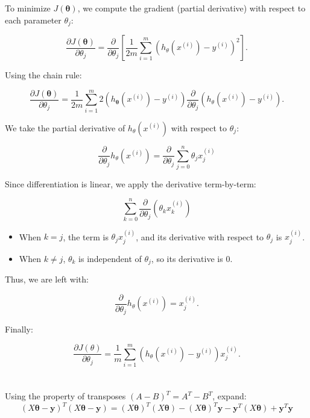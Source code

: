 To minimize \(J(\boldsymbol{\theta})\), we compute the gradient (partial derivative) with respect to each
parameter \(\theta_j\):

\[
\frac{\partial J(\boldsymbol{\theta})}{\partial \theta_j} = \frac{\partial}{\partial \theta_j} \left[ \frac{1}{2m} \sum_{i=1}^{m} \left( h_{\theta}(x^{(i)}) - y^{(i)} \right)^2 \right].
\]

Using the chain rule:

\[
\frac{\partial J(\boldsymbol{\theta})}{\partial \theta_j} = \frac{1}{2m} \sum_{i=1}^{m} 2 \left( h_{\boldsymbol{\theta}}(x^{(i)}) - y^{(i)} \right) \frac{\partial}{\partial \theta_j} \left( h_{\theta}(x^{(i)}) - y^{(i)} \right).
\]

We take the partial derivative of \( h_{\theta}(x^{(i)}) \) with respect to \( \theta_j \):

\[
\frac{\partial}{\partial \theta_j} h_{\theta}(x^{(i)}) = \frac{\partial}{\partial \theta_j} \sum_{j=0}^{n} \theta_j x_j^{(i)}
\]

Since differentiation is linear, we apply the derivative term-by-term:

\[
\sum_{k=0}^{n} \frac{\partial}{\partial \theta_j} (\theta_k x_k^{(i)})
\]

\begin{itemize}
    \item When \( k = j \), the term is \( \theta_j x_j^{(i)} \), and its derivative with respect to \( \theta_j \) is \( x_j^{(i)} \).
    \item When \( k \neq j \), \( \theta_k \) is independent of \( \theta_j \), so its derivative is $0$.
\end{itemize}


Thus, we are left with:

\[
\frac{\partial}{\partial \theta_j} h_{\theta}(x^{(i)}) = x_j^{(i)}.
\]

Finally:

\begin{equation}
\frac{\partial J(\theta)}{\partial \theta_j} = \frac{1}{m} \sum_{i=1}^{m} \left( h_{\theta}(x^{(i)}) - y^{(i)} \right) x_j^{(i)}.
\end{equation}
\\\\
Using the property of transposes \((A - B)^T = A^T - B^T\), expand:
\[
(X \boldsymbol{\theta} - \mathbf{y})^T (X \boldsymbol{\theta} - \mathbf{y}) = (X \boldsymbol{\theta})^T (X \boldsymbol{\theta}) - (X \boldsymbol{\theta})^T \mathbf{y} - \mathbf{y}^T (X \boldsymbol{\theta}) +\mathbf{y}^T \mathbf{y}
\]

